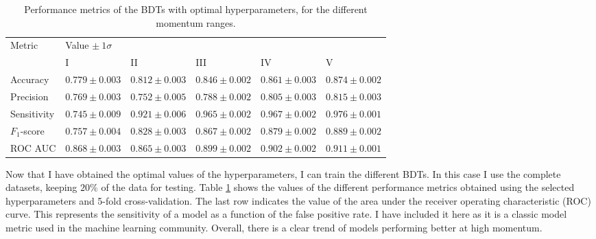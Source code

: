 \begin{table}[t]
	\caption{Performance metrics of the BDTs with optimal hyperparameters, for the different momentum ranges.}
	\begin{center}
		\begin{small}
			\begin{tabular}{l|lllll}
				\multirow{2}{*}{Metric} & \multicolumn{5}{l}{Value $\pm ~ 1\sigma$}                                                                \\[2mm] \cline{2-6}
										& \rule{0pt}{1.1\normalbaselineskip}I                 & II                & III               & IV                & V                 \\[2mm] \hline
										\rule{0pt}{1.1\normalbaselineskip}Accuracy                & $0.779 \pm 0.003$ & $0.812 \pm 0.003$ & $0.846 \pm 0.002$ & $0.861 \pm 0.003$ & $0.874 \pm 0.002$ \\[2mm]
				Precision               & $0.769 \pm 0.003$ & $0.752 \pm 0.005$ & $0.788 \pm 0.002$ & $0.805 \pm 0.003$ & $0.815 \pm 0.003$ \\[2mm]
				Sensitivity             & $0.745 \pm 0.009$ & $0.921 \pm 0.006$ & $0.965 \pm 0.002$ & $0.967 \pm 0.002$ & $0.976 \pm 0.001$ \\[2mm]
				$F_{1}$-score           & $0.757 \pm 0.004$ & $0.828 \pm 0.003$ & $0.867 \pm 0.002$ & $0.879 \pm 0.002$ & $0.889 \pm 0.002$ \\[2mm]
				ROC AUC                 & $0.868 \pm 0.003$ & $0.865 \pm 0.003$ & $0.899 \pm 0.002$ & $0.902 \pm 0.002$ & $0.911 \pm 0.001$
			\end{tabular}
		\end{small}
	\end{center}
	\label{tab:bdt_metrics}
\end{table}

Now that I have obtained the optimal values of the hyperparameters, I can train the different BDTs. In this case I use the complete datasets, keeping $20\%$ of the data for testing. Table \ref{tab:bdt_metrics} shows the values of the different performance metrics obtained using the selected hyperparameters and 5-fold cross-validation. The last row indicates the value of the area under the receiver operating characteristic (ROC) curve. This represents the sensitivity of a model as a function of the false positive rate. I have included it here as it is a classic model metric used in the machine learning community. Overall, there is a clear trend of models performing better at high momentum.


